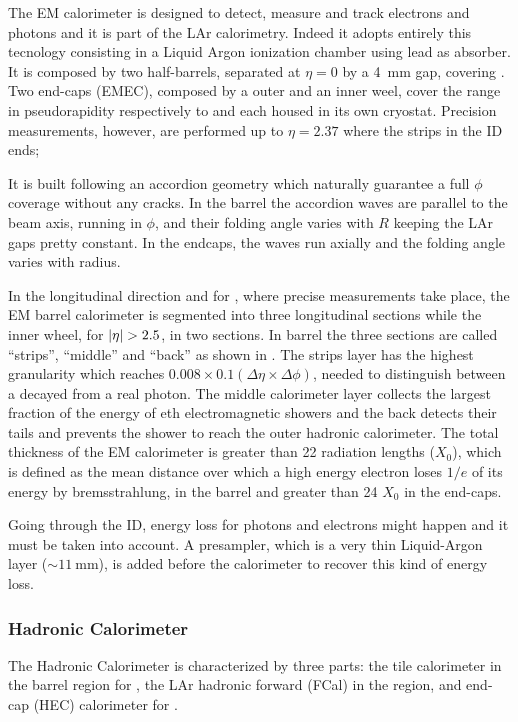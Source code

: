 The EM calorimeter is designed to detect, measure and track electrons and photons and it is part of the LAr calorimetry. Indeed it adopts entirely this tecnology consisting in a Liquid Argon ionization chamber using lead as absorber. It is composed by two half-barrels, separated at $\eta=0$ by a \SI{4}{\mm} gap, covering . Two end-caps (EMEC), composed by a outer and an inner weel, cover the range in pseudorapidity respectively to  and  each housed in its own cryostat. Precision measurements, however, are performed up to $\eta=2.37$ where the strips in the ID ends;

It is built following an accordion geometry which naturally guarantee a full $\phi$ coverage without any cracks. In the barrel the accordion waves are parallel to the beam axis, running in $\phi$, and their folding angle varies with $R$ keeping the LAr gaps pretty constant. In the endcaps, the waves run axially and the folding angle varies with radius.

In the longitudinal direction and for , where precise measurements take place, the EM barrel calorimeter is segmented into three longitudinal sections while the inner wheel, for $\lvert\eta\rvert>2.5$, in two sections. In barrel the three sections are called ``strips'', ``middle'' and ``back'' as shown in \Fig{\ref{fig:EMlayers}}. The strips layer has the highest granularity which reaches \mbox{$0.008 \times 0.1 \left(\Delta \eta \times \Delta \phi \right)$}, needed to distinguish between a decayed \pizero from a real photon. The middle calorimeter layer collects the largest fraction of the energy of eth electromagnetic showers and the back detects their tails and prevents the shower to reach the outer hadronic calorimeter. The total thickness of the EM calorimeter is greater than 22 radiation lengths ($X_0$), which is defined as the mean distance over which a high energy electron loses $1/e$ of its energy by bremsstrahlung, in the barrel and greater than 24 $X_0$ in the end-caps.
  
Going through the ID, energy loss for photons and electrons might happen and it must be taken into account. A presampler, which is a very thin Liquid-Argon layer ($\sim \SI{11}{\mm}$), is added before the calorimeter to recover this kind of energy loss.

\subsubsection{Hadronic Calorimeter}
The Hadronic Calorimeter is characterized by three parts: the tile calorimeter in the barrel region for , the LAr hadronic forward (FCal) in the  region, and end-cap (HEC) calorimeter for . 

